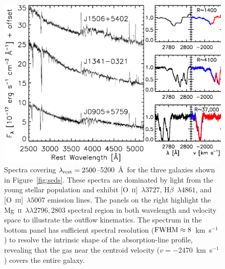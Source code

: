 \documentclass[apj]{emulateapj}
\newcommand{\kms}{km~s$^{-1}$}
\newcommand{\mgii}{\textrm{Mg}~\textsc{ii}}
\newcommand{\oii}{[\textrm{O}~\textsc{ii}]}
\newcommand{\oiii}{[\textrm{O}~\textsc{iii}]}
\newcommand{\lrest}{\lambda_{\textnormal{\scriptsize{rest}}}}
\begin{document}
\begin{figure}[!t]
\includegraphics[angle=0,scale=0.41]{spectra.ps}
\caption{Spectra covering $\lrest=2500$--5200~\AA\ for the three
  galaxies shown in Figure~\ref{fig:seds}.  These spectra are
  dominated by light from the young stellar population and exhibit
  \oii~$\lambda3727$, H$\beta$~$\lambda4861$, and \oiii~$\lambda5007$
  emission lines.  The panels on the right highlight the
  \mgii~$\lambda\lambda2796,2803$ spectral region in both wavelength
  and velocity space to illustrate the outflow kinematics.  The
  spectrum in the bottom panel has sufficient spectral resolution
  ($\textnormal{FWHM}\approx8$~\kms) to resolve the intrinsic shape of
  the absorption-line profile, revealing that the gas near the
  centroid velocity ($v=-2470$~\kms) covers the entire galaxy.}
\label{fig:spectra}
\end{figure}
\end{document}
